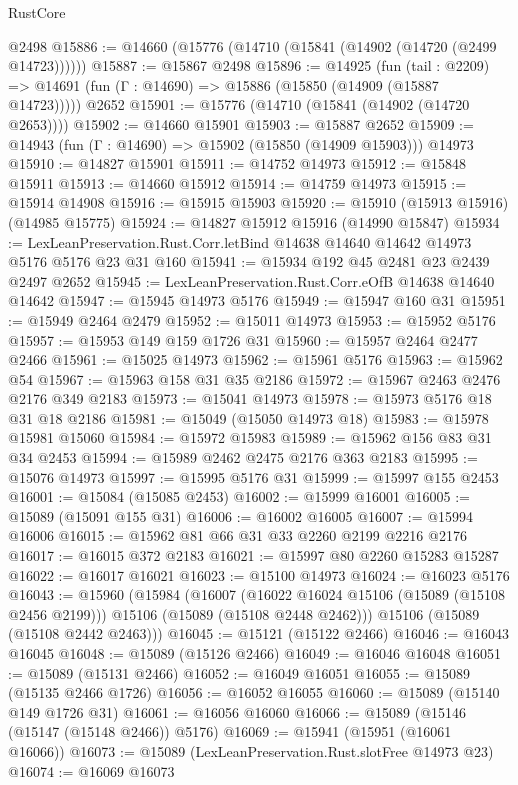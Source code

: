\begin{lexlean}{RustCore}
\begin{coremodule}
    @2498
@15886 := @14660 (@15776 (@14710 (@15841 (@14902 (@14720 (@2499 @14723))))))
@15887 := @15867 @2498
@15896 := @14925
    (fun (tail : @2209) => @14691 (fun (Γ : @14690) => @15886 (@15850 (@14909 (@15887 @14723)))))
    @2652
@15901 := @15776 (@14710 (@15841 (@14902 (@14720 @2653))))
@15902 := @14660 @15901
@15903 := @15887 @2652
@15909 := @14943 (fun (Γ : @14690) => @15902 (@15850 (@14909 @15903))) @14973
@15910 := @14827 @15901
@15911 := @14752 @14973
@15912 := @15848 @15911
@15913 := @14660 @15912
@15914 := @14759 @14973
@15915 := @15914 @14908
@15916 := @15915 @15903
@15920 := @15910 (@15913 @15916) (@14985 @15775)
@15924 := @14827 @15912 @15916 (@14990 @15847)
@15934 := LexLeanPreservation.Rust.Corr.letBind @14638 @14640 @14642 @14973 @5176 @5176 @23 @31 @160
@15941 := @15934 @192 @45 @2481 @23 @2439 @2497 @2652
@15945 := LexLeanPreservation.Rust.Corr.eOfB @14638 @14640 @14642
@15947 := @15945 @14973 @5176
@15949 := @15947 @160 @31
@15951 := @15949 @2464 @2479
@15952 := @15011 @14973
@15953 := @15952 @5176
@15957 := @15953 @149 @159 @1726 @31
@15960 := @15957 @2464 @2477 @2466
@15961 := @15025 @14973
@15962 := @15961 @5176
@15963 := @15962 @54
@15967 := @15963 @158 @31 @35 @2186
@15972 := @15967 @2463 @2476 @2176 @349 @2183
@15973 := @15041 @14973
@15978 := @15973 @5176 @18 @31 @18 @2186
@15981 := @15049 (@15050 @14973 @18)
@15983 := @15978 @15981 @15060
@15984 := @15972 @15983
@15989 := @15962 @156 @83 @31 @34 @2453
@15994 := @15989 @2462 @2475 @2176 @363 @2183
@15995 := @15076 @14973
@15997 := @15995 @5176 @31
@15999 := @15997 @155 @2453
@16001 := @15084 (@15085 @2453)
@16002 := @15999 @16001
@16005 := @15089 (@15091 @155 @31)
@16006 := @16002 @16005
@16007 := @15994 @16006
@16015 := @15962 @81 @66 @31 @33 @2260 @2199 @2216 @2176
@16017 := @16015 @372 @2183
@16021 := @15997 @80 @2260 @15283 @15287
@16022 := @16017 @16021
@16023 := @15100 @14973
@16024 := @16023 @5176
@16043 := @15960
    (@15984
      (@16007
        (@16022 @16024 @15106 (@15089 (@15108 @2456 @2199)))
        @15106
        (@15089 (@15108 @2448 @2462)))
      @15106
      (@15089 (@15108 @2442 @2463)))
@16045 := @15121 (@15122 @2466)
@16046 := @16043 @16045
@16048 := @15089 (@15126 @2466)
@16049 := @16046 @16048
@16051 := @15089 (@15131 @2466)
@16052 := @16049 @16051
@16055 := @15089 (@15135 @2466 @1726)
@16056 := @16052 @16055
@16060 := @15089 (@15140 @149 @1726 @31)
@16061 := @16056 @16060
@16066 := @15089 (@15146 (@15147 (@15148 @2466)) @5176)
@16069 := @15941 (@15951 (@16061 @16066))
@16073 := @15089 (LexLeanPreservation.Rust.slotFree @14973 @23)
@16074 := @16069 @16073

\end{coremodule}
\end{lexlean}
